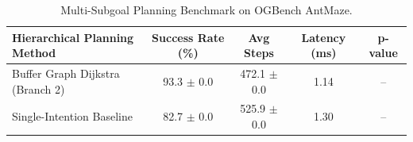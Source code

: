 \begin{table}[htbp]
\centering
\small
\begin{tabular}{lcccc}
\toprule
\textbf{Hierarchical Planning Method} & \textbf{Success Rate (\%)} & \textbf{Avg Steps} & \textbf{Latency (ms)} & \textbf{p-value} \\
\midrule
Buffer Graph Dijkstra (Branch 2) & 93.3 $\pm$ 0.0 & 472.1 $\pm$ 0.0 & 1.14 & -- \\
Single-Intention Baseline & 82.7 $\pm$ 0.0 & 525.9 $\pm$ 0.0 & 1.30 & -- \\
\bottomrule
\end{tabular}
\caption{Multi-Subgoal Planning Benchmark on OGBench AntMaze.}
\end{table}